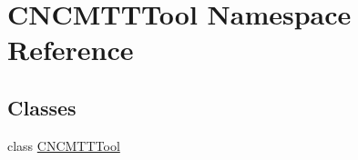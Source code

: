 \hypertarget{namespaceCNCMTTTool}{\section{C\-N\-C\-M\-T\-T\-Tool Namespace Reference}
\label{namespaceCNCMTTTool}
}
\subsection*{Classes}
\begin{DoxyCompactItemize}
\item 
class \hyperlink{classCNCMTTTool_1_1CNCMTTTool}{C\-N\-C\-M\-T\-T\-Tool}
\end{DoxyCompactItemize}
